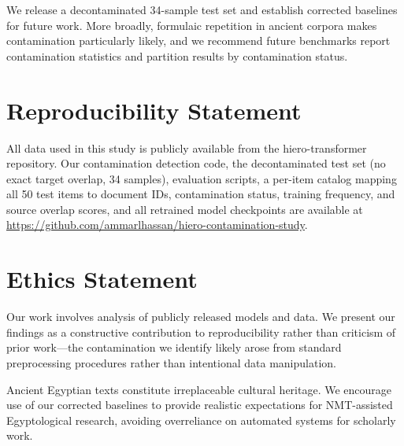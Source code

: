 \documentclass[11pt,a4paper]{article}
\begin{document}
We release a decontaminated 34-sample test set and establish corrected baselines for future work. More broadly, formulaic repetition in ancient corpora makes contamination particularly likely, and we recommend future benchmarks report contamination statistics and partition results by contamination status.

\section*{Reproducibility Statement}

All data used in this study is publicly available from the hiero-transformer repository. Our contamination detection code, the decontaminated test set (no exact target overlap, 34 samples), evaluation scripts, a per-item catalog mapping all 50 test items to document IDs, contamination status, training frequency, and source overlap scores, and all retrained model checkpoints are available at \url{https://github.com/ammarlhassan/hiero-contamination-study}.

\section*{Ethics Statement}

Our work involves analysis of publicly released models and data. We present our findings as a constructive contribution to reproducibility rather than criticism of prior work---the contamination we identify likely arose from standard preprocessing procedures rather than intentional data manipulation.

Ancient Egyptian texts constitute irreplaceable cultural heritage. We encourage use of our corrected baselines to provide realistic expectations for NMT-assisted Egyptological research, avoiding overreliance on automated systems for scholarly work.



\end{document}
